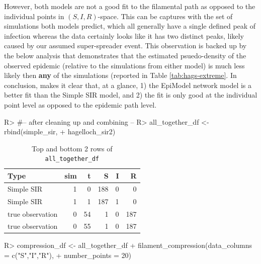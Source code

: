 \documentclass[
  shortnames]{jss}
\begin{document}
However, both models are not a good fit to the filamental path as
opposed to the individual points in \((S, I, R)\)-space. This can be
captures with the set of simulations both models predict, which all
generally have a single defined peak of infection whereas the data
certainly looks like it has two distinct peaks, likely caused by our
assumed super-spreader event. This observation is backed up by the below
analysis that demonstrates that the estimated psuedo-density of the
observed epidemic (relative to the simulations from either model) is
much less likely then \textbf{any} of the simulations (reported in Table
\ref{tab:hags-extreme}. In conclusion,  makes it clear
that, at a glance, 1) the EpiModel network model is a better fit than
the Simple SIR model, and 2) the fit is only good at the individual
point level as opposed to the epidemic path level.

\begin{CodeChunk}
\begin{CodeInput}
R> #-- after cleaning up and combining --
R> all_together_df <- rbind(simple_sir,
+                          hagelloch_sir2)
\end{CodeInput}
\end{CodeChunk}

\begin{CodeChunk}
\begin{table}[!h]

\caption{\label{tab:cif-all-together-df}Top and bottom 2 rows of \tt{all\_together\_df}}
\centering
\begin{tabular}[t]{lrrrrr}
\toprule
Type & sim & t & S & I & R\\
\midrule
Simple SIR & 1 & 0 & 188 & 0 & 0\\
Simple SIR & 1 & 1 & 187 & 1 & 0\\
true observation & 0 & 54 & 1 & 0 & 187\\
true observation & 0 & 55 & 1 & 0 & 187\\
\bottomrule
\end{tabular}
\end{table}

\end{CodeChunk}

\begin{CodeChunk}
\begin{CodeInput}
R> compression_df <- all_together_df %
+   filament_compression(data_columns = c("S","I","R"), 
+                        number_points = 20)
\end{CodeInput}
\end{CodeChunk}
\end{document}

